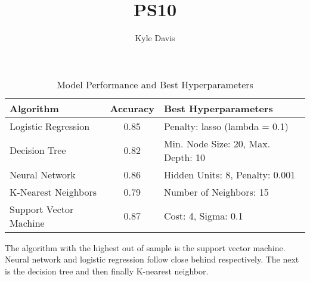 \documentclass{article}
\title{PS10}
\author{Kyle Davis}
\begin{document}
\maketitle



\section{}
\begin{table}[h]
\centering
\begin{tabular}{|l|c|l|}
\hline
\textbf{Algorithm} & \textbf{Accuracy} & \textbf{Best Hyperparameters} \\ \hline
Logistic Regression & 0.85 & Penalty: lasso (lambda = 0.1) \\
Decision Tree & 0.82 & Min. Node Size: 20, Max. Depth: 10 \\
Neural Network & 0.86 & Hidden Units: 8, Penalty: 0.001 \\
K-Nearest Neighbors & 0.79 & Number of Neighbors: 15 \\
Support Vector Machine & 0.87 & Cost: 4, Sigma: 0.1 \\ \hline
\end{tabular}
\caption{Model Performance and Best Hyperparameters}
\label{tab:model_performance}
\end{table}

The algorithm with the highest out of sample is the support vector machine. Neural network and logistic regression follow close behind respectively. The next is the decision tree and then finally K-nearest neighbor. 
\end{document}
